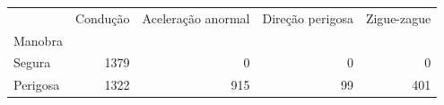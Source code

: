\begin{tabular}{lrrrr}
\toprule
 & Condução & Aceleração anormal & Direção perigosa & Zigue-zague \\
Manobra &  &  &  &  \\
\midrule
Segura & 1379 & 0 & 0 & 0 \\
Perigosa & 1322 & 915 & 99 & 401 \\
\bottomrule
\end{tabular}
